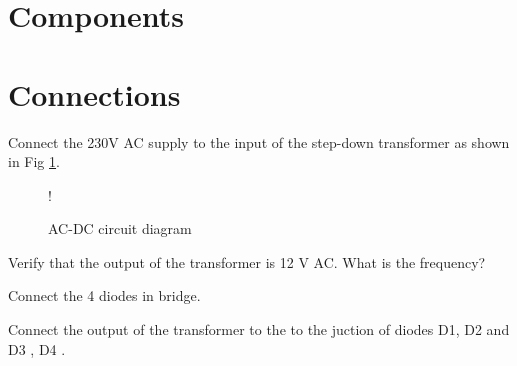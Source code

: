 \documentclass[journal,12pt,twocolumn]{IEEEtran}
\begin{document}
\section{Components}
\begin{table}[!ht]
\centering

\caption{}
\label{table:components}
\end{table}
\section{Connections}
\begin{problem}
Connect the 230V AC supply to the input of the step-down transformer as shown in Fig \ref{fig1}.
\end{problem}
\begin{figure}[!ht]
\centering
\resizebox {\columnwidth} {!} {

}
\caption{AC-DC circuit diagram} 
\label{fig1}
\end{figure}

\begin{problem}
Verify that the output of the transformer is 12 V AC.  What is the frequency?
\end{problem}
\begin{problem}
Connect the 4 diodes in bridge.
\end{problem}
\begin{problem}
Connect the output of the transformer to the to the juction of diodes D1, D2 and D3 , D4 .
\end{problem}
\end{document}
